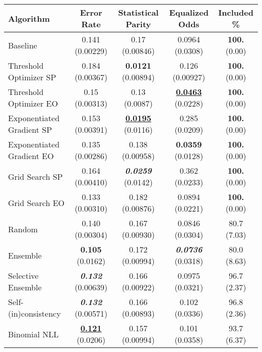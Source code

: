 \begin{tabular} {|l|c|c|c|c|}
\hline
\textbf{Algorithm} & \textbf{Error Rate} & \textbf{Statistical Parity} & \textbf{Equalized Odds} & \textbf{Included \%} \\ \hline
Baseline & 0.141 (0.00229) & 0.17 (0.00846) & 0.0964 (0.0308) & \textbf{100.} (0.00) \\ \hline 
Threshold Optimizer SP & 0.184 (0.00367) & \textbf{0.0121} (0.00894) & 0.126 (0.00927) & \textbf{100.} (0.00) \\ \hline 
Threshold Optimizer EO & 0.15 (0.00313) & 0.13 (0.0087) & \textbf{\underline{0.0463}} (0.0228) & \textbf{100.} (0.00) \\ \hline 
Exponentiated Gradient SP & 0.153 (0.00391) & \textbf{\underline{0.0195}} (0.0116) & 0.285 (0.0209) & \textbf{100.} (0.00) \\ \hline 
Exponentiated Gradient EO & 0.135 (0.00286) & 0.138 (0.00958) & \textbf{0.0359} (0.0128) & \textbf{100.} (0.00) \\ \hline 
Grid Search SP & 0.164 (0.00410) & \textbf{\textit{0.0259}} (0.0142) & 0.362 (0.0233) & \textbf{100.} (0.00) \\ \hline 
Grid Search EO & 0.133 (0.00310) & 0.182 (0.00876) & 0.0894 (0.0221) & \textbf{100.} (0.00) \\ \hline 
Random & 0.140 (0.00304) & 0.167 (0.00930) & 0.0846 (0.0304) & 80.7 (7.03) \\ \hline 
Ensemble & \textbf{0.105} (0.0162) & 0.172 (0.00994) & \textbf{\textit{0.0736}} (0.0318) & 80.0 (8.63) \\ \hline 
Selective Ensemble & \textbf{\textit{0.132}} (0.00639) & 0.166 (0.00922) & 0.0975 (0.0321) & 96.7 (2.37) \\ \hline 
Self-(in)consistency & \textbf{\textit{0.132}} (0.00571) & 0.166 (0.00893) & 0.102 (0.0336) & 96.8 (2.36) \\ \hline 
Binomial NLL & \textbf{\underline{0.121}} (0.0206) & 0.157 (0.00994) & 0.101 (0.0358) & 93.7 (6.37) \\ \hline 
\end{tabular}